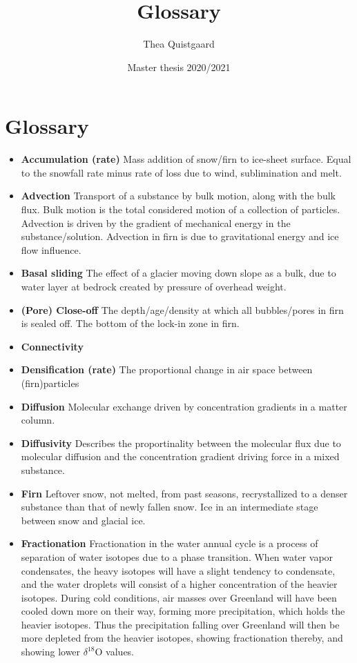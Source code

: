 \documentclass[11pt]{article}
\title{Glossary}
\author{Thea Quistgaard}
\date{Master thesis 2020/2021}
\begin{document}
\maketitle

\section{Glossary}
\begin{itemize}
	\item \textbf{Accumulation (rate)} Mass addition of snow/firn to  ice-sheet surface. Equal to the snowfall rate minus rate of loss due to wind, sublimination and melt.
	
	\item \textbf{Advection} Transport of a substance by bulk motion, along with the bulk flux. Bulk motion is the total considered motion of a collection of particles. Advection is driven by the gradient of mechanical energy in the substance/solution. Advection in firn is due to gravitational energy and ice flow influence.	
	
	\item \textbf{Basal sliding} The effect of a glacier moving down slope as a bulk, due to water layer at bedrock created by pressure of overhead weight.
	
	\item \textbf{(Pore) Close-off} The depth/age/density at which all bubbles/pores in firn is sealed off. The bottom of the lock-in zone in firn.
	
	\item \textbf{Connectivity}
	
	\item \textbf{Densification (rate)} The proportional change in air space between (firn)particles
	
	\item \textbf{Diffusion} Molecular exchange driven by concentration gradients in a matter column.
	
	\item \textbf{Diffusivity} Describes the proportinality between the molecular flux due to molecular diffusion and the concentration gradient driving force in a mixed substance.
	
	\item \textbf{Firn} Leftover snow, not melted, from past seasons, recrystallized to a denser substance than that of newly fallen snow. Ice in an intermediate stage between snow and glacial ice.
	
	\item \textbf{Fractionation} Fractionation in the water annual cycle is a process of separation of water isotopes due to a phase transition. When water vapor condensates, the heavy isotopes will have a slight tendency to condensate, and the water droplets will consist of a higher concentration of the heavier isotopes. During cold conditions, air masses over Greenland will have been cooled down more on their way, forming more precipitation, which holds the heavier isotopes. Thus the precipitation falling over Greenland will then be more depleted from the heavier isotopes, showing fractionation thereby, and showing lower $\delta^{18} \text{O}$ values.
	

\end{itemize}
\end{document}
